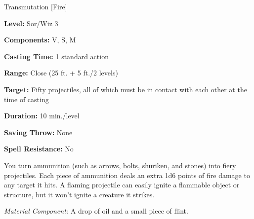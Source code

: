 
Transmutation [Fire]

\textbf{Level:} Sor/Wiz 3

\textbf{Components:} V, S, M

\textbf{Casting Time:} 1 standard action

\textbf{Range:} Close (25 ft. + 5 ft./2 levels)

\textbf{Target:} Fifty projectiles, all of which must be in contact with each other 
at the time of casting

\textbf{Duration:} 10 min./level

\textbf{Saving Throw:} None

\textbf{Spell Resistance:} No

You turn ammunition (such as arrows, bolts, shuriken, and stones) into fiery projectiles. 
Each piece of ammunition deals an extra 1d6 points of fire damage to any target 
it hits. A flaming projectile can easily ignite a flammable object or structure, 
but it won't ignite a creature it strikes.

\textit{Material Component:} A drop of oil and a small piece of flint.

